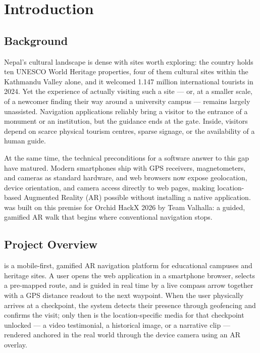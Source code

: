 \chapter{Introduction}
\label{ch:introduction}

\section{Background}
Nepal's cultural landscape is dense with sites worth exploring: the country
holds ten UNESCO World Heritage properties, four of them cultural sites within
the Kathmandu Valley alone, and it welcomed 1.147 million international
tourists in 2024. Yet the experience of actually visiting such a site --- or,
at a smaller scale, of a newcomer finding their way around a university
campus --- remains largely unassisted. Navigation applications reliably bring
a visitor to the entrance of a monument or an institution, but the guidance
ends at the gate. Inside, visitors depend on scarce physical tourism centres,
sparse signage, or the availability of a human guide.

At the same time, the technical preconditions for a software answer to this
gap have matured. Modern smartphones ship with GPS receivers, magnetometers,
and cameras as standard hardware, and web browsers now expose geolocation,
device orientation, and camera access directly to web pages, making
location-based Augmented Reality (AR) possible without installing a native
application. \projectname{} was built on this premise for Orchid HackX 2026
by Team Valhalla: a guided, gamified AR walk that begins where conventional
navigation stops.

\section{Project Overview}
\projectname{} is a mobile-first, gamified AR navigation platform for
educational campuses and heritage sites. A user opens the web application in
a smartphone browser, selects a pre-mapped route, and is guided in real time
by a live compass arrow together with a GPS distance readout to the next
waypoint. When the user physically arrives at a checkpoint, the system
detects their presence through geofencing and confirms the visit; only then
is the location-specific media for that checkpoint unlocked --- a video
testimonial, a historical image, or a narrative clip --- rendered anchored in
the real world through the device camera using an AR overlay.


